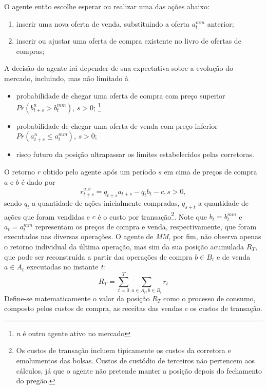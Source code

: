 O agente então escolhe esperar ou realizar uma das ações abaixo:
\begin{enumerate}
    \item inserir uma nova oferta de venda, substituindo a oferta $a_t^{mm}$ anterior;
    \item inserir ou ajustar uma oferta de compra existente no livro de ofertas de compras;
\end{enumerate}

A decisão do agente irá depender de sua expectativa sobre a evolução do mercado, incluindo, mas não limitado à
\begin{itemize}
    \item probabilidade de chegar uma oferta de compra com preço superior $Pr(b_{t + s}^{n} > b_{t}^{mm})$, $s > 0$; \footnote{\label{agent}\textit{n} é outro agente ativo no mercado}
    \item probabilidade de chegar uma oferta de venda com preço inferior $Pr(a_{t + s}^{n} \leq a_{t}^{mm})$, $s > 0$; 
    \item risco futuro da posição ultrapassar os limites estabelecidos pelas corretoras.
\end{itemize}

O retorno $r$ obtido pelo agente após um período $s$ em cima de preços de compra $a$ e $b$ é dado por
\begin{equation*}
    r_{t + s}^{a, b} = q_{t + s}a_{t + s} - q_{t}b_{t} - c, s > 0,
\end{equation*}
sendo $q_{t}$ a quantidade de ações inicialmente compradas, $q_{s + t}$ a quantidade de ações que foram vendidas e $c$ é o custo por transação\footnote{Os custos de transação incluem tipicamente os custos da corretora e emolumentos das bolsas. Custos de custódio de terceiros não pertencem aos cálculos, já que o agente não pretende manter a posição depois do fechamento do pregão.}. Note que $b_{t} = b_{t}^{mm}$ e $a_{t} = a_{t}^{mm}$ representam os preços de compra e venda, respectivamente, que foram executados nas diversas operações. 
O agente de \textit{MM}, por fim, não observa apenas o retorno individual da última operação, mas sim da sua posição acumulada $R_{T}$, que pode ser reconstruída a partir das operações de compra $b\in B_t$ e de venda $a\in A_t$ executadas no instante \textit{t}:
\begin{equation}
    R_{T} = \sum_{t=0}^{T} \sum_{a \in A_t, b \in B_t} r_t
\end{equation}
Define-se matematicamente o valor da posição $R_T$ como o processo de consumo, composto pelos custos de compra, as receitas das vendas e os custos de transação. 

